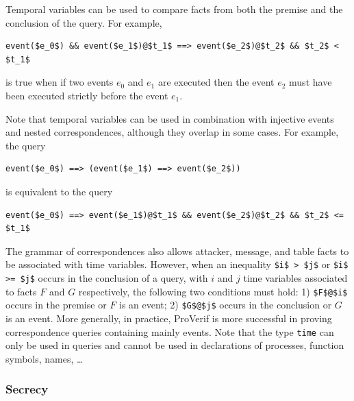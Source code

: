 \documentclass{book}
\begin{document}
Temporal variables can be used to compare facts from both the premise and the conclusion of the query. For example,
\begin{lstlisting}[numbers=none]
	event($e_0$) && event($e_1$)@$t_1$ ==> event($e_2$)@$t_2$ && $t_2$ < $t_1$
\end{lstlisting}
is true when if two events $e_0$ and $e_1$ are executed then the event $e_2$ must have been executed strictly before the event $e_1$.

Note that temporal variables can be used in combination with injective events and nested correspondences, although they overlap in some cases. For example, the query
\begin{lstlisting}[numbers=none]
	event($e_0$) ==> (event($e_1$) ==> event($e_2$))
\end{lstlisting}
is equivalent to the query
\begin{lstlisting}[numbers=none]
	event($e_0$) ==> event($e_1$)@$t_1$ && event($e_2$)@$t_2$ && $t_2$ <= $t_1$
\end{lstlisting}

The grammar of correspondences also allows attacker, message, and table facts to be associated with time variables.
However, when an inequality \lstinline!$i$ > $j$! or \lstinline!$i$ >= $j$! occurs in the conclusion of a query, with $i$ and $j$ time variables associated to facts $F$ and $G$ respectively, the following two conditions must hold:
1) \lstinline!$F$@$i$! occurs in the premise or $F$ is an event;
2) \lstinline!$G$@$j$! occurs in the conclusion or $G$ is an event.
More generally, in practice, ProVerif is more successful in proving correspondence queries containing mainly events. 
Note that the type \lstinline!time! can only be used in queries and cannot be used in declarations of processes, function symbols, names, \ldots

\subsubsection{Secrecy}
\end{document}
